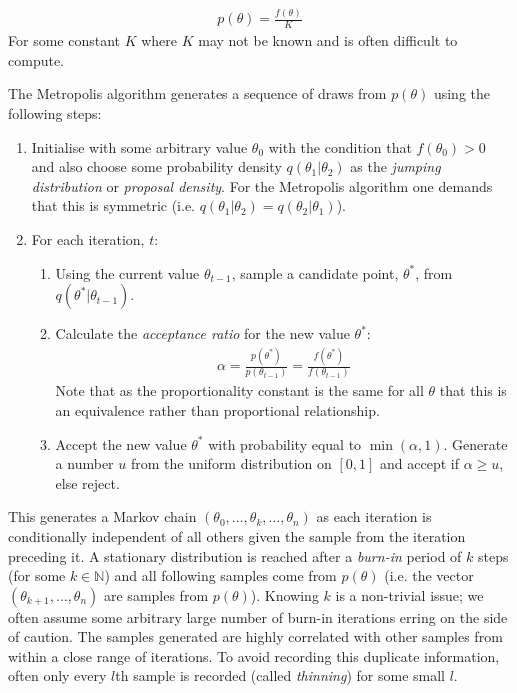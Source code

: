\documentclass[12pt]{article} %
\begin{document}
\begin{align}
p(\theta) = \frac{f(\theta)}{K} 
\end{align}
For some constant $K$ where $K$ may not be known and is often difficult to compute.

The Metropolis algorithm \citep{MetropolisMonteCarloMethod1949, MetropolisEquationStateCalculations1953} generates a sequence of draws from $p(\theta)$ using the following steps:

\begin{enumerate}
	\item Initialise with some arbitrary value $\theta_0$ with the condition that $f(\theta_0) > 0$ and also choose some probability density $q(\theta_1|\theta_2)$ as the \emph{jumping distribution} or \emph{proposal density}. For the Metropolis algorithm one demands that this is symmetric (i.e. $q(\theta_1 | \theta_2) = q(\theta_2 | \theta_1)$).
	\item For each iteration, $t$:
	\begin{enumerate}
		\item Using the current value $\theta_{t-1}$, sample a candidate point, $\theta^*$, from  $q(\theta^* | \theta_{t-1})$.
		\item Calculate the \emph{acceptance ratio} for the new value $\theta^*$:
		\begin{align}
		\alpha = \frac{p(\theta^*)}{p(\theta_{t-1})} = \frac{f(\theta^*)}{f(\theta_{t-1})}
		\end{align}
		Note that as the proportionality constant is the same for all $\theta$ that this is an equivalence rather than proportional relationship.
		\item Accept the new value $\theta^*$ with probability equal to $\min(\alpha, 1)$. Generate a number $u$ from the uniform distribution on $[0,1]$ and accept if $\alpha \geq u$, else reject.
	\end{enumerate}
\end{enumerate}
This generates a Markov chain $(\theta_0,\ldots,\theta_k,\ldots, \theta_n)$ as each iteration is conditionally independent of all others given the sample from the iteration preceding it. A stationary distribution is reached after a \emph{burn-in} period of $k$ steps (for some $k \in \mathbb{N}$) and all following samples come from $p(\theta)$ (i.e. the vector $(\theta_{k+1},\ldots,\theta_n)$ are samples from $p(\theta)$). Knowing $k$ is a non-trivial issue; we often assume some arbitrary large number of burn-in iterations erring on the side of caution. The samples generated are highly correlated with other samples from within a close range of iterations. To avoid recording this duplicate information, often only every $l$th sample is recorded (called \emph{thinning}) for some small $l$.
\end{document}

